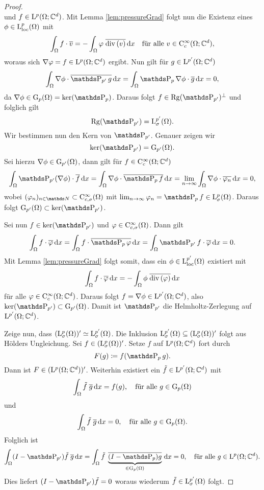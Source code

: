 \begin{proof}
$$  $$
  und $f \in \mathrm{L}^p(\Omega; \mathbb{C}^d)$.
  Mit Lemma \ref{lem:pressureGrad} folgt nun die Existenz eines $\phi \in \mathrm{L}^p_{\operatorname{loc}}(\Omega)$ mit
  $$
  \int_\Omega f \cdot \overline v = - \int_\Omega \varphi \; \overline{\mathrm{div\,} (v)} \, {\operatorname{d}\!{x}} \quad\text{für alle } v \in \mathrm{C}_c^\infty(\Omega; \mathbb{C}^d),
  $$
  woraus sich $\nabla\varphi = f \in \mathrm{L}^p(\Omega; \mathbb{C}^d)$ ergibt.
  Nun gilt für $g \in \mathrm{L}^{p'}(\Omega; \mathbb{C}^d)$
  $$
  \int_\Omega \nabla\phi \cdot \overline{\PP_{p'} g} \d x = \int_\Omega \PP_p\nabla \phi \cdot \overline g \d x = 0,
  $$
  da $\nabla \phi \in \GG_p(\Omega) = \ker(\PP_p)$.
  Daraus folgt $f \in \Rg(\PP_{p'})^\perp$ und folglich gilt 
  $$
  \Rg(\PP_{p'}) = \Ell_\sigma^{p'}(\Omega).
  $$
  Wir bestimmen nun den Kern von $\PP_{p'}$.
  Genauer zeigen wir
  $$
  \ker(\PP_{p'}) = \GG_{p'}(\Omega).
  $$
  Sei hierzu $\nabla \phi \in \mathrm{G}_{p'}(\Omega)$, dann gilt für $f \in \mathrm{C}_c^\infty(\Omega; \mathbb{C}^d)$
  $$
  \int_\Omega \PP_{p'}(\nabla\phi) \cdot \overline f \d x
  = \int_\Omega \nabla \phi \cdot \overline{\PP_p f} \d x
  = \lim_{n \to \infty} \int_\Omega \nabla \phi \cdot \overline{\varphi_n} \d x
  = 0,
  $$
  wobei $(\varphi_n)_{n \in \N} \subset \CC_{c,\sigma}^\infty(\Omega)$ mit $\lim_{n \to \infty} \varphi_n = \PP_p f \in \Ell^p_\sigma(\Omega)$.
  Daraus folgt $\GG_{p'}(\Omega) \subset \ker(\PP_{p'})$.

  Sei nun $f \in \ker(\PP_{p'})$ und $\varphi \in \mathrm{C}^\infty_{c,\sigma}(\Omega)$.
  Dann gilt
  $$
  \int_\Omega f \cdot \overline\varphi \d x 
  = \int_\Omega f \cdot \overline{\PP_p \varphi} \d x
  = \int_\Omega \PP_{p'} f \cdot \overline{\varphi} \d x = 0.
  $$
  Mit Lemma \ref{lem:pressureGrad} folgt somit, dass ein $\phi \in \mathrm{L}_{\operatorname{loc}}^{p'}(\Omega)$ existiert mit 
  $$
  \int_\Omega f \cdot \overline\varphi \, {\operatorname{d}\!{x}}
  = -\int_\Omega \phi \; \overline{\mathrm{div\,} (\varphi)} \, {\operatorname{d}\!{x}}
  $$
  für alle $\varphi \in \mathrm{C}_c^\infty(\Omega; \mathbb{C}^d)$.
  Daraus folgt $f = \nabla\phi \in \mathrm{L}^{p'}(\Omega; \mathbb{C}^d)$, also $\ker(\PP_{p'}) \subset \GG_{p'}(\Omega)$.
  Damit ist $\PP_{p'}$ die Helmholtz-Zerlegung auf $\mathrm{L}^{p'}(\Omega; \mathbb{C}^d)$.

  Zeige nun, dass $(\mathrm{L}_\sigma^{p}(\Omega))' \simeq \mathrm{L}^{p'}_\sigma(\Omega)$.
  Die Inklusion $\mathrm{L}_\sigma^{p'}(\Omega) \subseteq (\mathrm{L}_\sigma^p(\Omega))'$ folgt aus Hölders Ungleichung.
  Sei $f \in (\mathrm{L}_\sigma^p(\Omega))'$.
  Setze $f$ auf $\mathrm{L}^p(\Omega; \mathbb{C}^d)$ fort durch
  $$
  F(g) \coloneqq f(\PP_p g).
  $$
  Dann ist $F \in (\mathrm{L}^p(\Omega; \mathbb{C}^d))'$. Weiterhin existiert ein $\tilde f \in \mathrm{L}^{p'}(\Omega; \mathbb{C}^d)$ mit 
  $$
  \int_\Omega \tilde f \; \overline g \, {\operatorname{d}\!{x}} = f(g), \quad\text{für alle } g \in \mathrm{G}_p(\Omega)
  $$
  und
  $$
  \int_\Omega \tilde f \; \overline g \, {\operatorname{d}\!{x}} = 0, \quad\text{für alle } g \in \mathrm{G}_p(\Omega).
  $$
  Folglich ist
  $$
  \int_\Omega (I - \PP_{p'} ) \tilde f \; \overline g \d x 
  = \int_\Omega \tilde f \; \underbrace{\overline{(I - \PP_p)g}}_{\in \GG_p(\Omega)} \d x
  = 0, \quad\text{für alle } g \in \Ell^p(\Omega; \C^d).
  $$
  Dies liefert $(I - \PP_{p'}) \tilde f = 0$ woraus wiederum $\tilde f \in \mathrm{L}_\sigma^{p'}(\Omega)$ folgt.
\end{proof}

